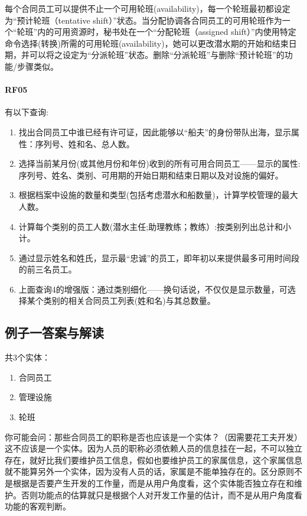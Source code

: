 每个合同员工可以提供不止一个可用轮班(availability)，每一个轮班最初都设定为“预计轮班（tentative shift）”状态。当分配协调各合同员工的可用轮班作为一个“轮班”内的可用资源时，秘书处在一个“分配轮班（assigned shift）”内使用特定命令选择(转换)所需的可用轮班(availability)，她可以更改潜水期的开始和结束日期，并可以将之设定为“分派轮班”状态。删除“分派轮班”与删除“预计轮班”的功能/步骤类似。

\hypertarget{rf05}{%
\paragraph{RF05}\label{rf05}}

有以下查询:

\begin{enumerate}
\tightlist
\item
  找出合同员工中谁已经有许可证，因此能够以``船夫''的身份带队出海，显示属性：序列号、姓和名、总人数。
\item
  选择当前某月份(或其他月份和年份)收到的所有可用合同员工------显示的属性:序列号、姓名、类别、可用期的开始日期和结束日期以及对设施的偏好。
\item
  根据档案中设施的数量和类型(包括考虑潜水和船数量)，计算学校管理的最大人数。
\item
  计算每个类别的员工人数(潜水主任;助理教练；教练）:按类别列出总计和小计。
\item
  通过显示姓名和姓氏，显示最``忠诚''的员工，即年初以来提供最多可用时间段的前三名员工。
\item
  上面查询4的增强版：通过类别细化------换句话说，不仅仅是显示数量，可选择某个类别的相关合同员工列表(姓和名)与其总数量。
\end{enumerate}

\hypertarget{ux4f8bux5b50ux4e00ux7b54ux6848ux4e0eux89e3ux8bfb}{%
\subsection{例子一答案与解读}\label{ux4f8bux5b50ux4e00ux7b54ux6848ux4e0eux89e3ux8bfb}}

共3个实体：

\begin{enumerate}
\tightlist
\item
  合同员工
\item
  管理设施
\item
  轮班
\end{enumerate}

你可能会问：那些合同员工的职称是否也应该是一个实体？（因需要花工夫开发）\\
这不应该是一个实体。因为人员的职称必须依赖人员的信息挂在一起，不可以独立存在，就好比我们要维护员工信息，假如也要维护员工的家属信息，这个家属信息就不能算另外一个实体，因为没有人员的话，家属是不能单独存在的。区分原则不是根据是否要产生开发的工作量，而是从用户角度看，这个实体能否独立存在和维护。否则功能点的估算就只是根据个人对开发工作量的估计，而不是从用户角度看功能的客观判断。

